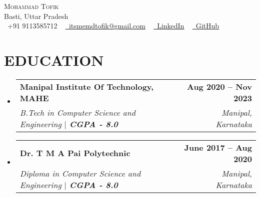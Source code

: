 \documentclass[letterpaper,11pt]{article}
\makeatletter
\newcommand{\resumeSubheading}[4]{
  \vspace{-2pt}\item
    \begin{tabular*}{1.0\textwidth}[t]{l@{\extracolsep{\fill}}r}
      \textbf{#1} & \textbf{\small #2} \\
      \textit{\small#3} & \textit{\small #4} \\
    \end{tabular*}\vspace{-7pt}
}
\newcommand{\resumeSubHeadingListStart}{\begin{itemize}[leftmargin=0.0in, label={}]}
\newcommand{\resumeSubHeadingListEnd}{\end{itemize}}
\makeatother
\begin{document}

\begin{center}
    {\Huge \scshape Mohammad Tofik} \\ \vspace{1pt}
    Basti, Uttar Pradesh \\ \vspace{1pt}
    \small \raisebox{-0.1\height}\faPhone\ +91 9113585712 ~ \href{mailto:x@gmail.com}{\raisebox{-0.2\height}\faEnvelope\  \underline{itsmemdtofik@gmail.com}} ~ 
    \href{https://www.linkedin.com/in/itsmemdtofik/}{\raisebox{-0.2\height}\faLinkedin\ \underline{LinkedIn}}  ~
    \href{https://github.com/itsmemdtofik}{\raisebox{-0.2\height}\faGithub\ \underline{GitHub}}
    \vspace{-8pt}
\end{center}


\section{EDUCATION}
  \resumeSubHeadingListStart
    \resumeSubheading
      {Manipal Institute Of Technology, MAHE}{Aug 2020 -- Nov 2023}
      {B.Tech in Computer Science and Engineering $|$ \textbf{CGPA - 8.0}}{Manipal, Karnataka}
      \resumeSubheading
      {Dr. T M A Pai Polytechnic}{June 2017 -- Aug 2020}
      {Diploma in Computer Science and Engineering $|$ \textbf{CGPA - 8.0}}{Manipal, Karnataka}
  \resumeSubHeadingListEnd

\end{document}
